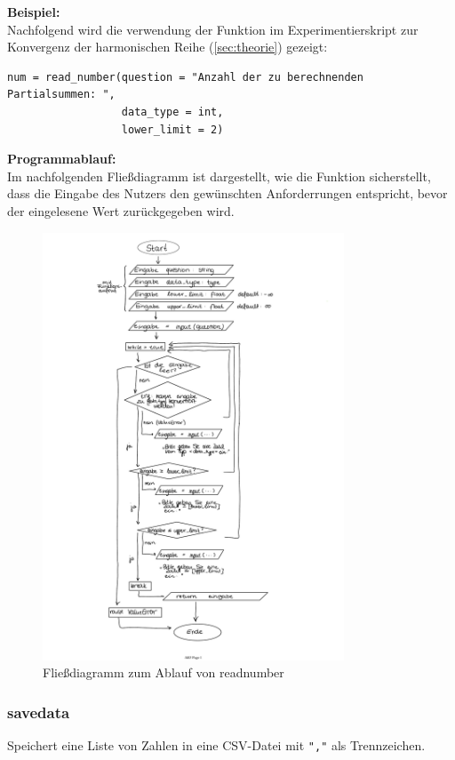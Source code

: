 \documentclass{scrreprt}
\begin{document}
\noindent \textbf{Beispiel:} \\
Nachfolgend wird die verwendung der Funktion im Experimentierskript zur Konvergenz der harmonischen Reihe (\autoref{sec:theorie}) gezeigt:
\begin{lstlisting}
num = read_number(question = "Anzahl der zu berechnenden Partialsummen: ", 
                  data_type = int, 
                  lower_limit = 2)
\end{lstlisting}

\noindent \textbf{Programmablauf:} \\
Im nachfolgenden Fließdiagramm ist dargestellt, wie die Funktion sicherstellt, dass die Eingabe des Nutzers den gewünschten Anforderrungen entspricht, bevor der eingelesene Wert zurückgegeben wird.

\begin{figure}
    \centering
    \includegraphics[width=0.8\textwidth]{AB3-flow_cropped.pdf}
    \caption{Fließdiagramm zum Ablauf von read\textunderscore number}
\end{figure}


\subsubsection{save\textunderscore data}
Speichert eine Liste von Zahlen in eine CSV-Datei mit \texttt{","} als Trennzeichen. \\
\end{document}
